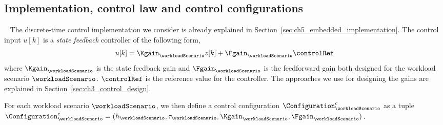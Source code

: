 \subsection{Implementation, control law and control configurations}~\label{sec:ch3_control law}
The discrete-time control implementation we consider is already explained in Section~\ref{sec:ch5_embedded_implementation}.
The control input $u[k]$ is a \emph{state feedback} controller of the following form,
 \begin{align}
		u[k] = \Kgain_{\workloadScenario} z[k] + \Fgain_{\workloadScenario} \controlRef \nonumber
 \end{align}
where $\Kgain_{\workloadScenario}$ is the state feedback gain and $\Fgain_{\workloadScenario}$ is the feedforward gain both designed for the workload scenario $\workloadScenario$. $\controlRef$ is the reference value for the controller. The approaches we use for designing the gains are explained in Section~\ref{sec:ch3_control_design}.

For each workload scenario $\workloadScenario$, we then define a control configuration $\Configuration_{\workloadScenario}^c$ as a tuple $\Configuration_{\workloadScenario}^c = (h_{\workloadScenario},\tau_{\workloadScenario}, \Kgain_{\workloadScenario}, \Fgain_{\workloadScenario})$.